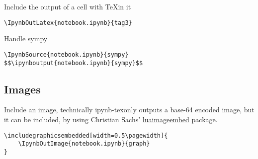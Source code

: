\documentclass[11pt]{article}
\def\projectname{ipynb-tex}
\begin{document}
\noindent Include the output of a cell with \TeX in it
\begin{Verbatim}
\IpynbOutLatex{notebook.ipynb}{tag3}
\end{Verbatim}

\noindent [In progress] Handle sympy
\begin{verbatim}
\IpynbSource{notebook.ipynb}{sympy}
$$\ipynboutput{notebook.ipynb}{sympy}$$
\end{verbatim}

\subsection{Images} 
Include an image, technically \projectname only outputs a base-64 encoded image, but it can be included, by using Christian Sachs' \href{https://ctan.org/tex-archive/macros/luatex/latex/luaimageembed?lang=en}{luaimageembed} package.
\begin{Verbatim}
\includegraphicsembedded[width=0.5\pagewidth]{
    \IpynbOutImage{notebook.ipynb}{graph}
}
\end{Verbatim}
\begin{center}
\end{center}
\end{document}
